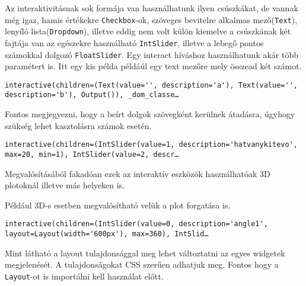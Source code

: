     Az interaktivitásnak sok formája van használhatunk ilyen csúszkákat, de
vannak még igaz, hamis értékekre \texttt{Checkbox}-ok, szöveges
bevitelre alkalmas mező(\texttt{Text}), lenyíló
lista(\texttt{Dropdown}), illetve eddig nem volt külön kiemelve a
csúszkának két fajtája van az egészekre használható \texttt{IntSlider},
illetve a lebegő pontos számokkal dolgozó \texttt{FloatSlider}. Egy
interact híváshoz használhatunk akár több paramétert is. Itt egy kis
példa példáúl egy text mezőre mely összead két számot.

\begin{python}

\end{python}

    
    \begin{verbatim}
interactive(children=(Text(value='', description='a'), Text(value='', description='b'), Output()), _dom_classe…
    \end{verbatim}

    
    Fontos megjegyezni, hogy a beírt dolgok szövegként kerülnek átadásra,
úgyhogy szükség lehet kasztolásra számok esetén.

\begin{python}

\end{python}

    
    \begin{verbatim}
interactive(children=(IntSlider(value=1, description='hatvanykitevo', max=20, min=1), IntSlider(value=2, descr…
    \end{verbatim}

    
    Megvalósításából fakadóan ezek az interaktív eszközök használhatóak 3D
plotoknál illetve más helyeken is.

    Például 3D-s esetben megvalósítható velük a plot forgatása is.

\begin{python}

\end{python}

    
    \begin{verbatim}
interactive(children=(IntSlider(value=0, description='angle1', layout=Layout(width='600px'), max=360), IntSlid…
    \end{verbatim}

    
    Mint látható a layout tulajdonsággal meg lehet változtatni az egyes
widgetek megjelenését. A tulajdonságokat CSS szerűen adhatjuk meg.
Fontos hogy a \texttt{Layout}-ot is importálni kell használat előtt.


